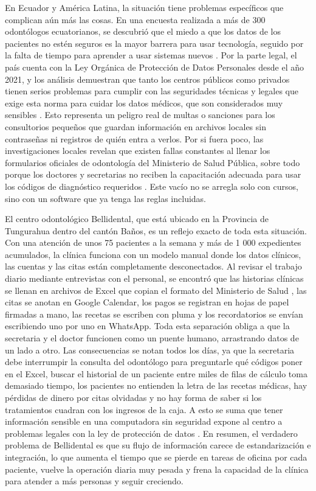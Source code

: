 En Ecuador y América Latina, la situación tiene problemas específicos que complican aún más las cosas. En una encuesta realizada a más de 300 odontólogos ecuatorianos, se descubrió que el miedo a que los datos de los pacientes no estén seguros es la mayor barrera para usar tecnología, seguido por la falta de tiempo para aprender a usar sistemas nuevos \cite{CherrezOjeda2020ICTDentists}. Por la parte legal, el país cuenta con la Ley Orgánica de Protección de Datos Personales desde el año 2021, y los análisis demuestran que tanto los centros públicos como privados tienen serios problemas para cumplir con las seguridades técnicas y legales que exige esta norma para cuidar los datos médicos, que son considerados muy sensibles \cite{martinez2022proteccion}. Esto representa un peligro real de multas o sanciones para los consultorios pequeños que guardan información en archivos locales sin contraseñas ni registros de quién entra a verlos. Por si fuera poco, las investigaciones locales revelan que existen fallas constantes al llenar los formularios oficiales de odontología del Ministerio de Salud Pública, sobre todo porque los doctores y secretarias no reciben la capacitación adecuada para usar los códigos de diagnóstico requeridos \cite{uce2016caracteristicas}. Este vacío no se arregla solo con cursos, sino con un software que ya tenga las reglas incluidas.

El centro odontológico Bellidental, que está ubicado en la Provincia de Tungurahua dentro del cantón Baños, es un reflejo exacto de toda esta situación. Con una atención de unos 75 pacientes a la semana y más de 1 000 expedientes acumulados, la clínica funciona con un modelo manual donde los datos clínicos, las cuentas y las citas están completamente desconectados. Al revisar el trabajo diario mediante entrevistas con el personal, se encontró que las historias clínicas se llenan en archivos de Excel que copian el formato del Ministerio de Salud \cite{uce2016caracteristicas}, las citas se anotan en Google Calendar, los pagos se registran en hojas de papel firmadas a mano, las recetas se escriben con pluma y los recordatorios se envían escribiendo uno por uno en WhatsApp. Toda esta separación obliga a que la secretaria y el doctor funcionen como un puente humano, arrastrando datos de un lado a otro. Las consecuencias se notan todos los días, ya que la secretaria debe interrumpir la consulta del odontólogo para preguntarle qué códigos poner en el Excel, buscar el historial de un paciente entre miles de filas de cálculo toma demasiado tiempo, los pacientes no entienden la letra de las recetas médicas, hay pérdidas de dinero por citas olvidadas y no hay forma de saber si los tratamientos cuadran con los ingresos de la caja. A esto se suma que tener información sensible en una computadora sin seguridad expone al centro a problemas legales con la ley de protección de datos \cite{martinez2022proteccion}. En resumen, el verdadero problema de Bellidental es que su flujo de información carece de estandarización e integración, lo que aumenta el tiempo que se pierde en tareas de oficina por cada paciente, vuelve la operación diaria muy pesada y frena la capacidad de la clínica para atender a más personas y seguir creciendo.